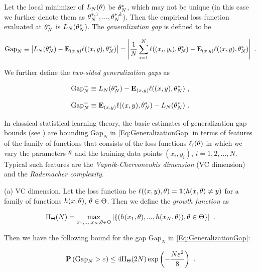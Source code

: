 Let the local minimizer of $L_N(\theta)$ be $\theta^*_N$, which may not be unique (in this case we
further denote them as $\theta_N^{*,1}, ..., \theta_N^{*,k}$).
Then the empirical loss function evaluated at $\theta_N^*$
is $L_N(\theta_N^*)$. The \textit{generalization gap} is defined to be

\begin{equation}\label{Eq:GeneralizationGap}
\text{Gap}_N  \equiv \left|L_N(\theta_N^*)-\mathbf E_{(x,y)} \ell((x,y), \theta_N^*)\right|
= \left|\dfrac{1}{N}\sum\limits_{i=1}^N \ell((x_i, y_i), \theta_N^*)-\mathbf E_{(x,y)} \ell((x,y), \theta_N^*)\right| \ .
\end{equation}

We further define the \textit{two-sided generalization gaps} as

\begin{equation}\label{Eq:GeneralizationGap-Empirical-Expected}
\text{Gap}_N^+  \equiv L_N(\tht_N^*)-\E_{(x,y)} \ell((x,y), \tht_N^*) \ ,
\end{equation}

\begin{equation}\label{Eq:GeneralizationGap-Expected-Empirical}
\text{Gap}_N^-  \equiv \E_{(x,y)} \ell((x,y), \tht_N^*)-L_N(\tht_N^*) \ .
\end{equation}


In classical statistical learning theory, the basic estimates of generalization gap
bounds (see \cite{VapnikStatisticalLearningTheory}) are bounding $\text{Gap}_N$
in \eqref{Eq:GeneralizationGap} in terms of features of the family of functions
that consists of the loss functions $\ell_i(\theta)$ in which we vary the parameters $\theta$ and
the training data points $(x_i, y_i)$, $i=1,2,...,N$.
Typical such features are the \textit{Vapnik-Chervonenkis dimension} (VC dimension) and
the \textit{Rademacher complexity}. 

(a) VC dimension. Let the loss function be $\ell((x,y), \theta)=\mathbf 1(h(x,\theta)\neq y)$ for a family of functions $h(x,\theta)$, $\theta\in \Theta$.
Then we define the \textit{growth function} as

\begin{equation}\label{Eq:GrowthFunction}
\Pi_{\Theta}(N)=\max_{x_1, ... , x_N, \theta\in \Theta}\left|\{(h(x_1,\theta), ..., h(x_N, \theta)), \theta\in \Theta\}\right| \ .
\end{equation}

Then we have the following bound for the gap
$\text{Gap}_N$ in \eqref{Eq:GeneralizationGap}:

\begin{equation}\label{Eq:GeneralizationGapGrowthFunction}
\mathbf P\left(\text{Gap}_N >\varepsilon\right)\leq 4\Pi_{\Theta}(2N)\exp\left(-\dfrac{N\varepsilon^2}{8}\right) \ .
\end{equation}


